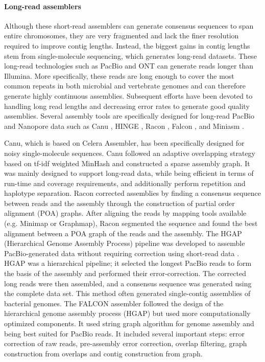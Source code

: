 \paragraph{Long-read assemblers}
Although these short-read assemblers can generate consensus sequences to span entire chromosomes, they are very fragmented and lack the finer resolution required to improve contig lengths. 
Instead, the biggest gains in contig lengths stem from single-molecule sequencing, which generates long-read datasets.
These long-read technologies such as PacBio and ONT can generate reads longer than Illumina. 
More specifically, these reads are long enough to cover the most common repeats in both microbial and vertebrate genomes and can therefore generate highly continuous assemblies. 
Subsequent efforts have been devoted to handling long read lengths and decreasing error rates to generate good quality assemblies.
Several assembly tools are specifically designed for long-read PacBio and Nanopore data such as Canu \citep{koren2017canu}, HINGE \citep{kamath2017hinge}, Racon \citep{vaser2017fast}, Falcon \citep{chin2016phased}, and Miniasm \citep{li2016minimap}.

Canu, which is based on Celera Assembler, has been specifically designed for noisy single-molecule sequences.
Canu followed an adaptive overlapping strategy based on tf-idf weighted MinHash \citep{berlin2015assembling} and constructed a sparse assembly graph.
It was mainly designed to support long-read data, while being efficient in terms of run-time and coverage requirements, and additionally perform repetition and haplotype separation.
Racon corrected assemblies by finding a consensus sequence between reads and the assembly through the construction of partial order alignment (POA) graphs.
After aligning the reads by mapping tools available (e.g. Minimap or Graphmap),
Racon segmented the sequence and found the best alignment between a POA graph of the reads and the assembly.
The HGAP (Hierarchical Genome Assembly Process) pipeline
was developed to assemble PacBio-generated data without requiring correction using short-read
data \citep{chin2013nonhybrid}. HGAP was a hierarchical pipeline; it selected the longest PacBio reads to form the basis
of the assembly and performed their error-correction. The corrected
long reads were then assembled, and a consensus sequence was generated using the complete data
set. This method often generated single-contig assemblies of bacterial genomes.
The FALCON assembler followed the design of the hierarchical genome assembly process (HGAP) but used more computationally optimized components. 
It used string graph algorithm for genome assembly and being best suited for PacBio reads.
It included several important steps: error correction of raw reads, pre-assembly error correction, overlap filtering, graph construction from overlaps and contig construction from graph.

